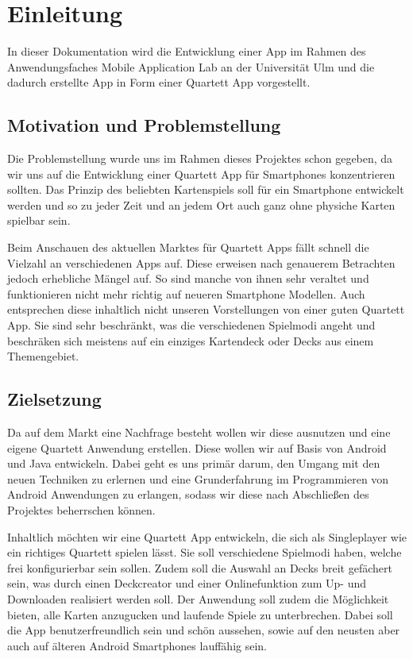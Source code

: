 \chapter{Einleitung}
\label{cha:einleitung}

In dieser Dokumentation wird die Entwicklung einer App im Rahmen des Anwendungsfaches Mobile Application Lab an der Universität Ulm und die dadurch erstellte App in Form einer Quartett App vorgestellt.

\section{Motivation und Problemstellung}
\label{sec:einleitung:problemstellung}

Die Problemstellung wurde uns im Rahmen dieses Projektes schon gegeben, da wir uns auf die Entwicklung einer Quartett App für Smartphones konzentrieren sollten. Das Prinzip des beliebten Kartenspiels soll für ein Smartphone entwickelt werden und so zu jeder Zeit und an jedem Ort auch ganz ohne physiche Karten spielbar sein.

Beim Anschauen des aktuellen Marktes für Quartett Apps fällt schnell die Vielzahl an verschiedenen Apps auf. Diese erweisen nach genauerem Betrachten jedoch erhebliche Mängel auf. So sind manche von ihnen sehr veraltet und funktionieren nicht mehr richtig auf neueren Smartphone Modellen. Auch entsprechen diese inhaltlich nicht unseren Vorstellungen von einer guten Quartett App. Sie sind sehr beschränkt, was die verschiedenen Spielmodi angeht und beschräken sich meistens auf ein einziges Kartendeck oder Decks aus einem Themengebiet.

\section{Zielsetzung}
\label{sec:einleitung:zielsetzung}

Da auf dem Markt eine Nachfrage besteht wollen wir diese ausnutzen und eine eigene Quartett Anwendung erstellen. Diese wollen wir auf Basis von Android und Java entwickeln. Dabei geht es uns primär darum, den Umgang mit den neuen Techniken zu erlernen und eine Grunderfahrung im Programmieren von Android Anwendungen zu erlangen, sodass wir diese nach Abschließen des Projektes beherrschen können.

Inhaltlich möchten wir eine Quartett App entwickeln, die sich als Singleplayer wie ein richtiges Quartett spielen lässt. Sie soll verschiedene Spielmodi haben, welche frei konfigurierbar sein sollen. Zudem soll die Auswahl an Decks breit gefächert sein, was durch einen Deckcreator und einer Onlinefunktion zum Up- und Downloaden realisiert werden soll. Der Anwendung soll zudem die Möglichkeit bieten, alle Karten anzugucken und laufende Spiele zu unterbrechen. Dabei soll die App benutzerfreundlich sein und schön aussehen, sowie auf den neusten aber auch auf älteren Android Smartphones lauffähig sein.


